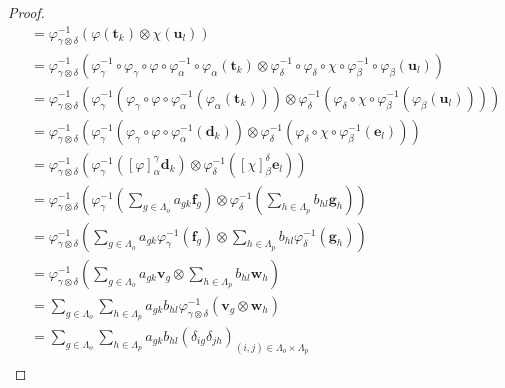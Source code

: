 \documentclass[dvipdfmx]{jsarticle}
\begin{document}
\begin{proof}
\begin{align*}
&= \varphi_{\gamma \otimes \delta}^{- 1}\left( \varphi\left( \mathbf{t}_{k} \right) \otimes \chi\left( \mathbf{u}_{l} \right) \right)\\
&= \varphi_{\gamma \otimes \delta}^{- 1}\left( \varphi_{\gamma}^{- 1} \circ \varphi_{\gamma} \circ \varphi \circ \varphi_{\alpha}^{- 1} \circ \varphi_{\alpha}\left( \mathbf{t}_{k} \right) \otimes \varphi_{\delta}^{- 1} \circ \varphi_{\delta} \circ \chi \circ \varphi_{\beta}^{- 1} \circ \varphi_{\beta}\left( \mathbf{u}_{l} \right) \right)\\
&= \varphi_{\gamma \otimes \delta}^{- 1}\left( \varphi_{\gamma}^{- 1}\left( \varphi_{\gamma} \circ \varphi \circ \varphi_{\alpha}^{- 1}\left( \varphi_{\alpha}\left( \mathbf{t}_{k} \right) \right) \right) \otimes \varphi_{\delta}^{- 1}\left( \varphi_{\delta} \circ \chi \circ \varphi_{\beta}^{- 1}\left( \varphi_{\beta}\left( \mathbf{u}_{l} \right) \right) \right) \right)\\
&= \varphi_{\gamma \otimes \delta}^{- 1}\left( \varphi_{\gamma}^{- 1}\left( \varphi_{\gamma} \circ \varphi \circ \varphi_{\alpha}^{- 1}\left( \mathbf{d}_{k} \right) \right) \otimes \varphi_{\delta}^{- 1}\left( \varphi_{\delta} \circ \chi \circ \varphi_{\beta}^{- 1}\left( \mathbf{e}_{l} \right) \right) \right)\\
&= \varphi_{\gamma \otimes \delta}^{- 1}\left( \varphi_{\gamma}^{- 1}\left( [\varphi]^{\gamma}_{\alpha}\mathbf{d}_{k} \right) \otimes \varphi_{\delta}^{- 1}\left( [\chi]^{\delta}_{\beta}\mathbf{e}_{l} \right) \right)\\
&= \varphi_{\gamma \otimes \delta}^{- 1}\left( \varphi_{\gamma}^{- 1}\left( \sum_{g \in \varLambda_{o}} {a_{gk}\mathbf{f}_{g}} \right) \otimes \varphi_{\delta}^{- 1}\left( \sum_{h \in \varLambda_{p}} {b_{hl}\mathbf{g}_{h}} \right) \right)\\
&= \varphi_{\gamma \otimes \delta}^{- 1}\left( \sum_{g \in \varLambda_{o}} {a_{gk}\varphi_{\gamma}^{- 1}\left( \mathbf{f}_{g} \right)} \otimes \sum_{h \in \varLambda_{p}} {b_{hl}\varphi_{\delta}^{- 1}\left( \mathbf{g}_{h} \right)} \right)\\
&= \varphi_{\gamma \otimes \delta}^{- 1}\left( \sum_{g \in \varLambda_{o}} {a_{gk}\mathbf{v}_{g}} \otimes \sum_{h \in \varLambda_{p}} {b_{hl}\mathbf{w}_{h}} \right)\\
&= \sum_{g \in \varLambda_{o}} {\sum_{h \in \varLambda_{p}} {a_{gk}b_{hl}\varphi_{\gamma \otimes \delta}^{- 1}\left( \mathbf{v}_{g} \otimes \mathbf{w}_{h} \right)}}\\
&= \sum_{g \in \varLambda_{o}} {\sum_{h \in \varLambda_{p}} {a_{gk}b_{hl}\left( \delta_{ig}\delta_{jh} \right)_{(i,j) \in \varLambda_{o} \times \varLambda_{p}}}}\\

\end{align*}
\end{proof}
\end{document}
